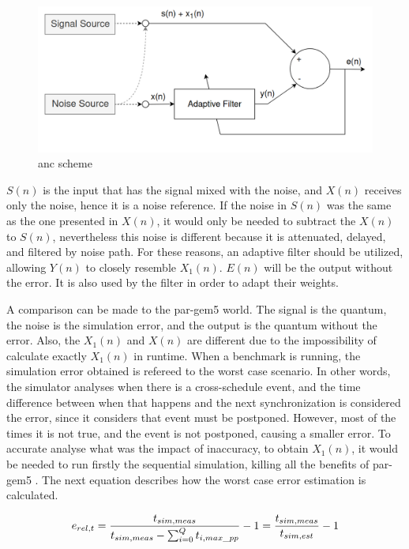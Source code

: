 \begin{figure}[H]
	\centering
 	\includegraphics[width=0.7\linewidth]{Images/AdaptiveNoiseCancellationScheme.png}
 	\caption{\gls{anc} scheme}
	 \label{fig_AdaptiveNoiseCancellationScheme}
\end{figure}

$S(n)$ is the input that has the signal mixed with the noise, and $X(n)$ receives only the noise, hence it is a noise reference. If the noise in $S(n)$ was the same as the one presented in $X(n)$, it would only be needed to subtract the $X(n)$ to $S(n)$, nevertheless this noise is different because it is attenuated, delayed, and filtered by noise path. For these reasons, an adaptive filter should be utilized, allowing $Y(n)$ to closely resemble $X_{1}(n)$. $E(n)$ will be the output without the error. It is also used by the filter in order to adapt their weights.

A comparison can be made to the par-gem5 world. The signal is the quantum, the noise is the simulation error, and the output is the quantum without the error. Also, the $X_{1}(n)$ and $X(n)$ are different due to the impossibility of calculate exactly $X_{1}(n)$ in runtime. When a benchmark is running, the simulation error obtained is refereed to the worst case scenario. In other words, the simulator analyses when there is a cross-schedule event, and the time difference between when that happens and the next synchronization is considered the error, since it considers that event must be postponed. However, most of the times it is not true, and the event is not postponed, causing a smaller error. To accurate analyse what was the impact of inaccuracy, to obtain $X_{1}(n)$, it would be needed to run firstly the sequential simulation, killing all the benefits of par-gem5 \cite{pargem5}. The next equation describes how the worst case error estimation is calculated. 

\begin{equation}
    \label{eq_errSim}
    \centering
        \Large
        e_{rel,t} = \frac{t_{sim,meas}}{t_{sim,meas}-\sum_{i=0}^{Q}t_{i,max\_pp}} -1  = \frac{t_{sim,meas}}{t_{sim,est}}-1
        \normalsize
\end{equation}
\vspace{0.3cm}

